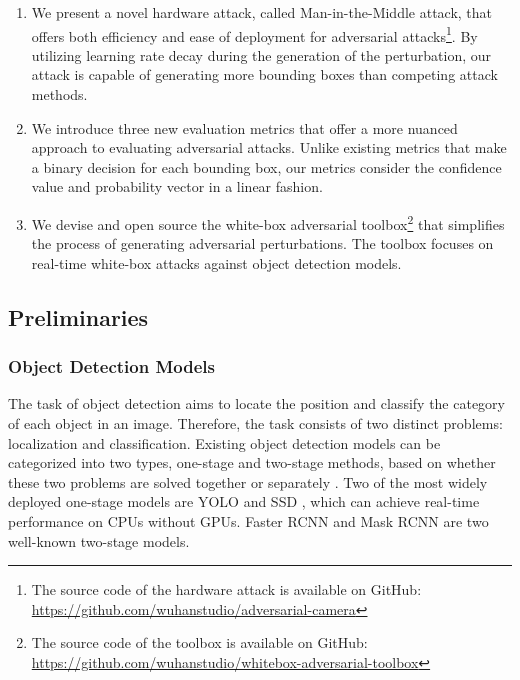 \begin{enumerate}
    \item We present a novel hardware attack, called Man-in-the-Middle attack, that offers both efficiency and ease of deployment for adversarial attacks\footnote{The source code of the hardware attack is available on GitHub: \url{https://github.com/wuhanstudio/adversarial-camera}}. By utilizing learning rate decay during the generation of the perturbation, our attack is capable of generating more bounding boxes than competing attack methods.
    \item We introduce three new evaluation metrics that offer a more nuanced approach to evaluating adversarial attacks. Unlike existing metrics that make a binary decision for each bounding box, our metrics consider the confidence value and probability vector in a linear fashion.
    \item We devise and open source the white-box adversarial toolbox\footnote{The source code of the toolbox is available on GitHub: \url{https://github.com/wuhanstudio/whitebox-adversarial-toolbox}} that simplifies the process of generating adversarial perturbations. The toolbox focuses on real-time white-box attacks against object detection models. 
\end{enumerate}


\subsection{Preliminaries}


\subsubsection{Object Detection Models}

The task of object detection aims to locate the position and classify the category of each object in an image. Therefore, the task consists of two distinct problems: localization and classification. Existing object detection models can be categorized into two types, one-stage and two-stage methods, based on whether these two problems are solved together or separately \cite{Zhao2019}. Two of the most widely deployed one-stage models are YOLO \cite{redmon2016you, redmon2018yolov3, bochkovskiy2020yolov4} and SSD \cite{liu2016ssd}, which can achieve real-time performance on CPUs without GPUs. Faster RCNN \cite{ren2015faster} and Mask RCNN \cite{he2017mask} are two well-known two-stage models. 

